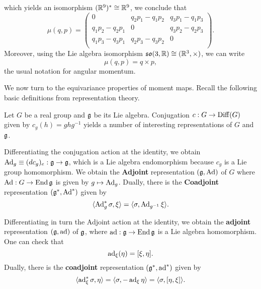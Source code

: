 \documentclass{amsart}
\begin{document}
\begin{example}
    which yields an isomorphism $(\mathbb{R}^9)^*\cong\mathbb{R}^9$, we conclude that
    \begin{equation*}
        \mu(q,p) =
        \begin{pmatrix}
            0 & q_2p_1-q_1p_2 & q_3p_1-q_1p_3 \\
            q_1p_2-q_2p_1 & 0 & q_3p_2-q_2p_3 \\
            q_1p_3-q_3p_1 & q_2p_3-q_3p_2 & 0\\
        \end{pmatrix}.
    \end{equation*}
    Moreover, using the Lie algebra isomorphism $\mathfrak{so}(3,\mathbb{R})\cong (\mathbb{R}^3,\times)$, we can write
    \begin{equation*}
        \mu(q,p) = q \times p,
    \end{equation*}
    the usual notation for angular momentum.
\end{example}

\begin{example}
    
\end{example}

We now turn to the equivariance properties of moment maps. Recall the following
basic definitions from representation theory.

\begin{definition}
    Let $G$ be a real group and $\mathfrak g$ be its Lie algebra. Conjugation $c:G\to \operatorname{Diff}(G)$
    given by $c_g(h)=ghg^{-1}$ yields a number of interesting representations of $G$
    and $\mathfrak g$.
    
    Differentiating the conjugation action at the identity, we obtain $\operatorname{Ad}_g\equiv(dc_g)_e:\mathfrak g\to \mathfrak g$,
    which is a Lie algebra endomorphism
    because $c_g$ is a Lie group homomorphism. We obtain the \textbf{Adjoint} representation $(\mathfrak g,\operatorname{Ad})$
    of $G$ where $\operatorname{Ad}:G\to\operatorname{End} \mathfrak g$ is given by $g\mapsto \operatorname{Ad}_g$. Dually, there is the
    \textbf{Coadjoint} representation $(\mathfrak g^*, \operatorname{Ad}^*)$ given by
    \begin{equation*}
        \langle\operatorname{Ad}^*_g\sigma,\xi\rangle = \langle \sigma, \operatorname{Ad}_{g^{-1}}\xi\rangle.
    \end{equation*}

    Differentiating in turn the Adjoint action at the identity, we obtain the \textbf{adjoint}
    representation $(\mathfrak g, \operatorname{ad})$ of $\mathfrak g$, where $\operatorname{ad}:\mathfrak g\to\operatorname{End}\mathfrak g$ is a Lie algebra
    homomorphism. One can check that
    \begin{equation*}
        \operatorname{ad}_\xi(\eta) = [\xi,\eta].
    \end{equation*}
    Dually, there is the \textbf{coadjoint} representation $(\mathfrak g^*, \operatorname{ad}^*)$ given by
    \begin{equation*}
        \langle\operatorname{ad}^*_\xi\sigma, \eta\rangle = \langle\sigma, -\operatorname{ad}_\xi\eta\rangle = \langle \sigma, [\eta,\xi]\rangle.
    \end{equation*}
\end{definition}
\end{document}
